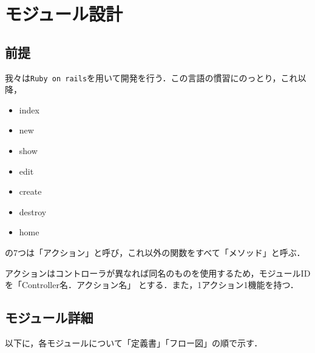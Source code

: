 \chapter{モジュール設計}
\section{前提}
我々は\texttt{Ruby on rails}を用いて開発を行う．この言語の慣習にのっとり，これ以降，
\begin{itemize}
    \item index
    \item new
    \item show
    \item edit
    \item create
    \item destroy
    \item home
\end{itemize}
の7つは「アクション」と呼び，これ以外の関数をすべて「メソッド」と呼ぶ．\par
アクションはコントローラが異なれば同名のものを使用するため，モジュールIDを「Controller名．アクション名」
とする．また，1アクション1機能を持つ．

\section{モジュール詳細}
以下に，各モジュールについて「定義書」「フロー図」の順で示す．


